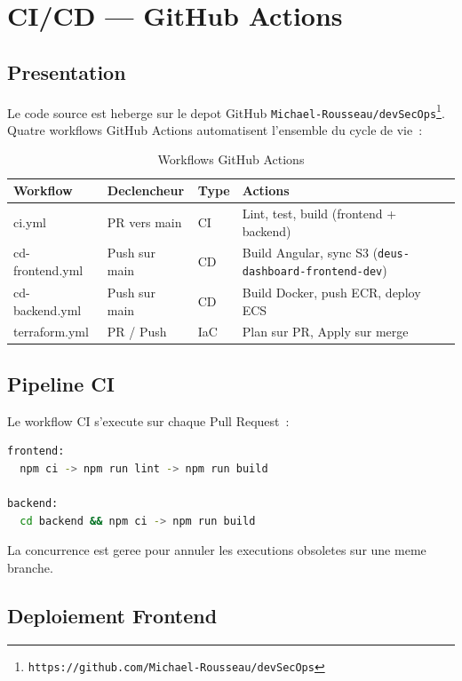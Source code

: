 \chapter{CI/CD --- GitHub Actions}

\section{Presentation}

Le code source est heberge sur le depot GitHub
\texttt{Michael-Rousseau/devSecOps}\footnote{\texttt{https://github.com/Michael-Rousseau/devSecOps}}.
Quatre workflows GitHub Actions automatisent l'ensemble du cycle de vie~:

\begin{table}[H]
    \centering
    \begin{tabularx}{\textwidth}{lllX}
        \toprule
        \textbf{Workflow} & \textbf{Declencheur} & \textbf{Type} & \textbf{Actions} \\
        \midrule
        ci.yml & PR vers main & CI & Lint, test, build (frontend + backend) \\
        cd-frontend.yml & Push sur main & CD & Build Angular, sync S3 (\texttt{deus-dashboard-frontend-dev}) \\
        cd-backend.yml & Push sur main & CD & Build Docker, push ECR, deploy ECS \\
        terraform.yml & PR / Push & IaC & Plan sur PR, Apply sur merge \\
        \bottomrule
    \end{tabularx}
    \caption{Workflows GitHub Actions}
\end{table}

\section{Pipeline CI}

Le workflow CI s'execute sur chaque Pull Request~:

\begin{lstlisting}[language=bash,caption={Jobs CI en parallele}]
frontend:
  npm ci -> npm run lint -> npm run build

backend:
  cd backend && npm ci -> npm run build
\end{lstlisting}

La concurrence est geree pour annuler les executions obsoletes sur une meme branche.

\section{Deploiement Frontend}

